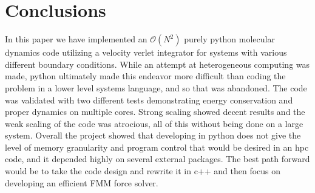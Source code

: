 \documentclass[%
 reprint,
 amsmath,amssymb,
 aps,
pra,
prb,
rmp,
prstab,
prstper,
]{revtex4-1}
\begin{document}
\section{\label{sec:level1}Conclusions}
In this paper we have implemented an $\mathcal{O}(N^{2})$ purely python molecular dynamics code utilizing a velocity verlet integrator for systems with various
different boundary conditions. While an attempt at heterogeneous computing was
made, python ultimately made this endeavor more difficult than coding the problem
in a lower level systems language, and so that was abandoned. The code was
validated with two different tests demonstrating energy conservation and proper
dynamics on multiple cores. Strong scaling showed decent results and the weak scaling
of the code was atrocious, all of this without being done on a large system. 
Overall the project showed that developing in python does not give the level
of memory granularity and program control that would be desired in an hpc code,
and it depended highly on several external packages. The best path forward would
be to take the code design and rewrite it in c++ and then focus on developing an
efficient FMM force solver. 



\end{document}
